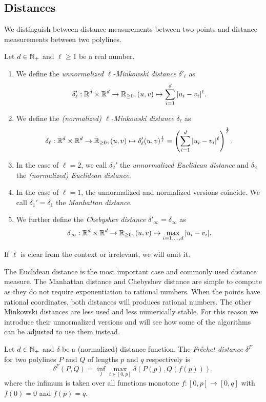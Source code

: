 \subsection{Distances}
\label{ssec:distances}
We distinguish between distance measurements between two points and distance measurements between two polylines. 
\begin{definition}\label{def:point_distance}
  Let \(d \in \mathbb{N}_+\) and \(\ell \geq 1\) be a real number.
  \begin{enumerate}
    \item We define the \emph{unnormalized \(\ell\)-Minkowski distance} \(\delta'_\ell\) as 
      \[\delta'_\ell:\mathbb{R}^d \times \mathbb{R}^d \to \mathbb{R}_{\geq 0}, (u, v) \mapsto \sum_{i = 1}^d |u_i - v_i|^\ell.\]
    \item We define the \emph{(normalized) \(\ell\)-Minkowski distance} \(\delta_\ell\) as 
      \[\delta_\ell:\mathbb{R}^d \times \mathbb{R}^d \to \mathbb{R}_{\geq 0}, (u, v) \mapsto \delta'_\ell(u, v)^{\frac1\ell} = \left(\sum_{i = 1}^d |u_i - v_i|^\ell\right)^{\frac1\ell}.\]
    \item In the case of \(\ell = 2\), we call \(\delta_2'\)  the \emph{unnormalized Euclidean distance} and \(\delta_2\) the \emph{(normalized) Euclidean distance}.
    \item In the case of \(\ell = 1\), the unnormalized and normalized versions coincide. We call \(\delta_1' = \delta_1\) the \emph{Manhattan distance}. 
    \item We further define the \emph{Chebyshev distance} \(\delta'_\infty = \delta_\infty\) as 
      \[\delta_\infty:\mathbb{R}^d \times \mathbb{R}^d \to \mathbb{R}_{\geq 0}, (u, v) \mapsto \max_{i = 1, \dots, d} |u_i - v_i|.\]
  \end{enumerate}

  If \(\ell\) is clear from the context or irrelevant, we will omit it.
\end{definition}

The Euclidean distance is the most important case and commonly used distance measure. The Manhattan distance and Chebyshev distance are simple to compute as they do not require exponentiation to rational numbers. When the points have rational coordinates, both distances will produces rational numbers.
The other Minkowski distances are less used and less numerically stable. For this reason we introduce their unnormalized versions and will see how some of the algorithms can be adjusted to use them instead. 

\begin{definition}
  Let \(d \in \mathbb{N}_+\) and \(\delta\) be a (normalized) distance function. The \emph{Fréchet distance} \(\delta^F\) for two polylines \(P\) and \(Q\) of lengths \(p\) and \(q\) respectively is 
  \[\delta^F(P, Q) = \inf_f \max_{t \in [0, p]}\delta(P(p), Q(f(p))),\]
  where the infimum is taken over all functions monotone \(f:[0,p] \to [0, q]\) with \(f(0) = 0\) and \(f(p) = q\).
\end{definition}

